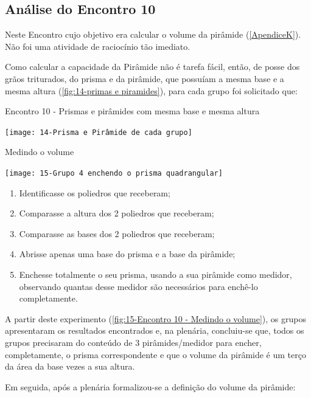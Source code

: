 \subsection{Análise do Encontro 10}

Neste Encontro cujo objetivo era calcular o volume da pirâmide (\autoref{ApendiceK}). Não foi uma atividade de raciocínio tão imediato.

Como calcular a capacidade da Pirâmide não é tarefa fácil, então, de posse dos grãos triturados, do prisma e da pirâmide, que possuíam a mesma base e a mesma altura (\autoref{fig:14-primas e piramides}), para cada grupo foi solicitado que:

\begin{CenteredFigure}
    \caption{Encontro 10 - Prismas e pirâmides com mesma base e mesma altura} \label{fig:14-primas e piramides}
    \texttt{[image: 14-Prisma e Pirâmide de cada grupo]}
    \legend{\autoria}
\end{CenteredFigure}

\begin{CenteredFigure}
    \caption{Medindo o volume} \label{fig:15-Encontro 10 - Medindo o volume}
    \texttt{[image: 15-Grupo 4 enchendo o prisma quadrangular]}
    \legend{\autoria}
\end{CenteredFigure}

\begin{enumerate}
    \item Identificasse os poliedros que receberam;
    \item Comparasse a altura dos 2 poliedros que receberam;
    \item Comparasse as bases dos 2 poliedros que receberam;
    \item Abrisse apenas uma base do prisma e a base da pirâmide;
    \item Enchesse totalmente o seu prisma, usando a sua pirâmide como medidor, observando quantas desse medidor são necessários para enchê-lo completamente.
\end{enumerate}

A partir deste experimento (\autoref{fig:15-Encontro 10 - Medindo o volume}), os grupos apresentaram os resultados encontrados e, na plenária, concluiu-se que, todos os grupos precisaram do conteúdo de 3 pirâmides/medidor para encher, completamente, o prisma correspondente e que o volume da pirâmide é um terço da área da base vezes a sua altura.

Em seguida, após a plenária formalizou-se a definição do volume da pirâmide:

